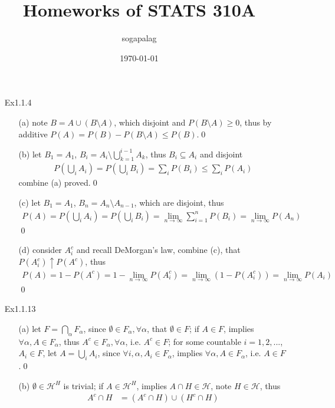 \documentclass[paper=a4, fontsize=11pt]{scrartcl} %
\title{Homeworks of STATS 310A}
\author{sogapalag}
\date{\normalsize\today}
\numberwithin{equation}{section} %
\numberwithin{figure}{section} %
\numberwithin{table}{section} %
\begin{document}
\maketitle
\begin{itemize}
	\item[Ex1.1.4] 
	\begin{itemize}
		\item[(a)] note $B = A \cup (B\setminus A)$, which disjoint and $P(B\setminus A)\geq 0$, thus by additive $P(A)=P(B)-P(B\setminus A)\leq P(B)$.\qed
		\item[(b)] let $B_1= A_1$, $B_i = A_i\setminus \bigcup_{k=1}^{i-1} A_k$, thus $B_i\subseteq A_i$ and disjoint
		\begin{align}
			P(\bigcup_i A_i)  = P(\bigcup_i B_i) =\sum_i P(B_i) \leq \sum_i P(A_i)
		\end{align}
		combine (a) proved.\qed
		\item[(c)] let $B_1= A_1$, $B_n = A_n\setminus A_{n-1}$, which are disjoint, thus
		\begin{align}
			P(A) = P(\bigcup_i A_i) = P(\bigcup_i B_i) = \lim_{n\rightarrow\infty} \sum_{i=1}^n P(B_i) = \lim_{n\rightarrow \infty} P(A_n)
		\end{align}\qed
		\item[(d)] consider $A_i^c$ and recall DeMorgan's law, combine (c), that $P(A_i^c)\uparrow P(A^c)$, thus
		\begin{align}
			P(A) = 1-P(A^c) = 1 - \lim_{n\rightarrow \infty} P(A_i^c) = \lim_{n\rightarrow \infty} (1 - P(A_i^c)) = \lim_{n\rightarrow \infty}  P(A_i)
		\end{align}\qed
	\end{itemize}
	\item[Ex1.1.13]
	\begin{itemize}
		\item[(a)] let $F = \bigcap_\alpha F_\alpha$, since $\emptyset\in F_{\alpha}, \forall \alpha$, that $\emptyset\in F$; if $A\in F$, implies $\forall \alpha,  A\in F_\alpha$, thus $A^c\in F_\alpha, \forall \alpha$, i.e. $A^c\in F$; for some countable $i=1,2,...$, $A_i\in F$, let $A=\bigcup_i A_i$, since $\forall i,\alpha, A_i\in F_\alpha$, implies $\forall \alpha, A\in F_\alpha$, i.e. $A\in F$.\qed
		\item[(b)] $\emptyset\in \mathcal{H}^H$ is trivial; if $A\in \mathcal{H}^H$, implies $A\cap H\in \mathcal{H}$, note $H\in \mathcal{H}$, thus
		\begin{align}
			A^c \cap H &= (A^c \cap H) \cup (H^c \cap H) \\

\end{align}
\end{itemize}
\end{itemize}
\end{document}
